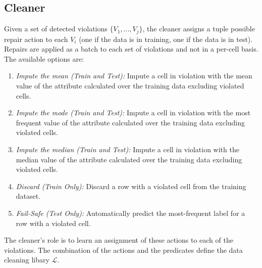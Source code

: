 \subsection{Cleaner}
Given a set of detected violations $\{V_1,...,V_j\}$, the cleaner assigns a tuple possible repair action to each $V_i$ (one if the data is in training, one if the data is in test).
Repairs are applied as a batch to each set of violations and not in a per-cell basis.
The available options are:
\begin{enumerate}
    \item \emph{Impute the mean (Train and Test): } Impute a cell in violation with the mean value of the attribute calculated over the training data excluding violated cells.
    \item \emph{Impute the mode (Train and Test): } Impute a cell in violation with the most frequent value of the attribute calculated over the training data excluding violated cells.
    \item \emph{Impute the median (Train and Test): }Impute a cell in violation with the median value of the attribute calculated over the training data excluding violated cells.
     \item \emph{Discard (Train Only): } Discard a row with a violated cell from the training dataset.
     \item \emph{Fail-Safe (Test Only): } Automatically predict the most-frequent label for a row with a violated cell.
\end{enumerate}

The cleaner's role is to learn an assignment of these actions to each of the violations.
The combination of the actions and the predicates define the data cleaning libary $\mathcal{L}$.







